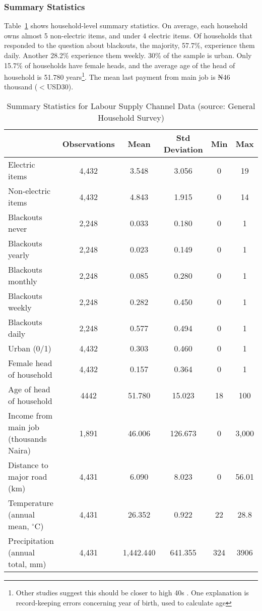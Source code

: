 \documentclass[12pt]{article}
\begin{document}
\subsubsection{Summary Statistics}
Table~\ref{tab:summarystats1} shows household-level summary statistics. On average, each household owns almost 5 non-electric items, and under 4 electric items. Of households that responded to the question about blackouts, the majority, 57.7\%, experience them daily. Another 28.2\% experience them weekly. 30\% of the sample is urban. Only 15.7\% of households have female heads, and the average age of the head of household is 51.780 years\footnote{Other studies suggest this should be closer to high 40s \cite{adeyemo2012a}. One explanation is record-keeping errors concerning year of birth, used to calculate age}. The mean last payment from main job is ₦46 thousand ($<$USD30). 
\begin{table}[htbp]\centering \footnotesize
\caption{Summary Statistics for Labour Supply Channel Data (source: General Household Survey)}
\label{tab:summarystats1}
\begin{tabular}{l*{1}{c c c c c}}
        \hline\hline  \
        &    Observations &    Mean&          Std Deviation&         Min&         Max\\
\hline
Electric items      &    4,432&       3.548&       3.056&           0&          19\\
Non-electric items   &    4,432&       4.843&       1.915&           0&          14\\

Blackouts never     &    2,248&       0.033&       0.180&           0&           1\\
Blackouts yearly    &    2,248&       0.023&       0.149&           0&           1\\
Blackouts monthly   &    2,248&       0.085&       0.280&           0&           1\\
Blackouts weekly    &    2,248&       0.282&       0.450&           0&           1\\
Blackouts daily     &    2,248&       0.577&       0.494&           0&           1\\
Urban (0/1)               &    4,432&       0.303&       0.460&           0&           1\\
Female head of household              &    4,432&       0.157&       0.364&           0&           1\\
Age of head of household                  &    4442 &      51.780&      15.023&          18&         100\\
Income from main job (thousands Naira)  &    1,891&      46.006&     126.673&           0&        3,000\\
Distance to major road (km) &    4,431&       6.090&       8.023&           0&       56.01\\
Temperature (annual mean, $^\circ\text{C}$)    &    4,431&      26.352&       0.922&          22&        28.8\\
Precipitation (annual total, mm) &    4,431&    1,442.440&     641.355&         324&        3906\\
\hline\hline
\end{tabular}
\end{table}
\end{document}
